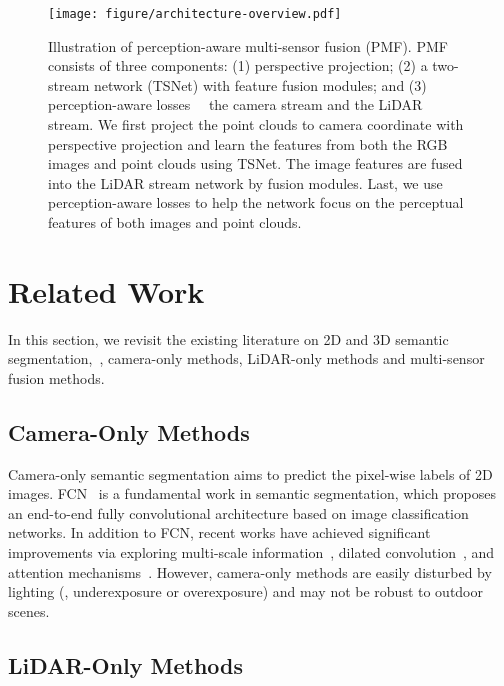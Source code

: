 \documentclass[10pt,twocolumn,letterpaper]{article}
\begin{document}
\begin{figure*}
    \centering
    \texttt{[image: figure/architecture-overview.pdf]}
    \caption{Illustration of perception-aware multi-sensor fusion (PMF). PMF consists of three components: (1) perspective projection; (2) a two-stream network (TSNet) with feature fusion modules; and (3) perception-aware losses ~\wrt~the camera stream and the LiDAR stream. We first project the point clouds to camera coordinate with perspective projection and learn the features from both the RGB images and point clouds using TSNet. The image features are fused into the LiDAR stream network by fusion modules. Last, we use perception-aware losses to help the network focus on the perceptual features of both images and point clouds.}
    \label{fig:arch_overview}
\end{figure*}


\section{Related Work}
In this section, we revisit the existing literature on 2D and 3D semantic segmentation,~\ie, camera-only methods, LiDAR-only methods and multi-sensor fusion methods. 
\subsection{Camera-Only Methods}


Camera-only semantic segmentation aims to predict the pixel-wise labels of 2D images. FCN~\cite{Long2015FullyCN} is a fundamental work in semantic segmentation, which proposes an end-to-end fully convolutional architecture based on image classification networks. In addition to FCN, recent works have achieved significant improvements via exploring multi-scale information~\cite{chen2017deeplab, lin2016efficient, zhao2017pyramid}, dilated convolution~\cite{chen2017rethinking,mehta2018espnet,wang2018understanding}, and attention mechanisms~\cite{huang2019ccnet,yuan2018ocnet}. However, camera-only methods are easily disturbed by lighting (\eg, underexposure or overexposure) and may not be robust to outdoor scenes.

\subsection{LiDAR-Only Methods}
\end{document}
